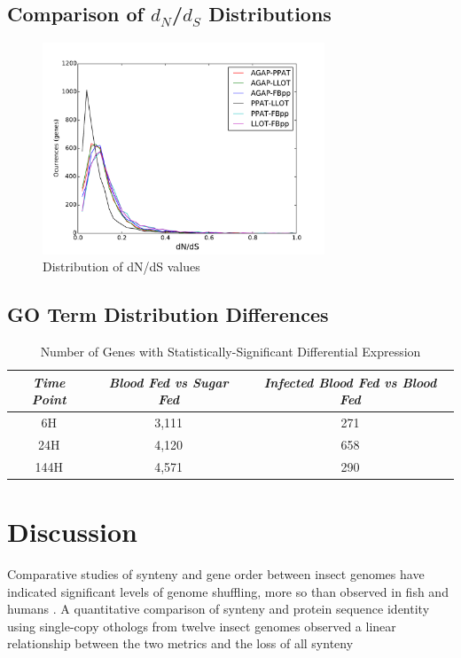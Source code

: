 \subsection{Comparison of $d_N$/$d_S$ Distributions}
\begin{figure}[H]
  \centering
  \includegraphics[width=0.75\textwidth]{figures/ka_ks/dN_dS}
  \caption{Distribution of dN/dS values}
  \label{fig:dnds-distr}
\end{figure}

\subsection{GO Term Distribution Differences}

\begin{table}[H]
  \centering
  \begin{tabular}{c c c} \hline
  \emph{Time Point} & \emph{Blood Fed vs Sugar Fed} & \emph{Infected Blood Fed vs Blood Fed} \\ \hline
  6H & 3,111 & 271 \\ \hline
  24H & 4,120 & 658 \\ \hline
  144H & 4,571 & 290 \\ \hline
  \end{tabular}
  \caption{Number of Genes with Statistically-Significant Differential Expression}
  \label{tab:stat-sig-genes}
\end{table}

\section{Discussion}
Comparative studies of synteny and gene order between insect genomes have indicated significant levels of genome shuffling, more so than observed in fish and humans \cite{Zdobnov2007}. A quantitative comparison of synteny and protein sequence identity using single-copy othologs from twelve insect genomes observed a linear relationship between the two metrics and the loss of all synteny

